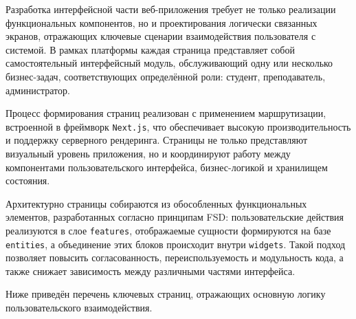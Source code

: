 Разработка интерфейсной части веб-приложения требует не только реализации функциональных компонентов, но и проектирования логически связанных экранов, отражающих ключевые сценарии взаимодействия пользователя с системой. В рамках платформы каждая страница представляет собой самостоятельный интерфейсный модуль, обслуживающий одну или несколько бизнес-задач, соответствующих определённой роли: студент, преподаватель, администратор.

Процесс формирования страниц реализован с применением маршрутизации, встроенной в фреймворк \texttt{Next.js}, что обеспечивает высокую производительность и поддержку серверного рендеринга. Страницы не только представляют визуальный уровень приложения, но и координируют работу между компонентами пользовательского интерфейса, бизнес-логикой и хранилищем состояния. 

Архитектурно страницы собираются из обособленных функциональных элементов, разработанных согласно принципам FSD: пользовательские действия реализуются в слое \texttt{features}, отображаемые сущности формируются на базе \texttt{entities}, а объединение этих блоков происходит внутри \texttt{widgets}. Такой подход позволяет повысить согласованность, переиспользуемость и модульность кода, а также снижает зависимость между различными частями интерфейса.

Ниже приведён перечень ключевых страниц, отражающих основную логику пользовательского взаимодействия.

